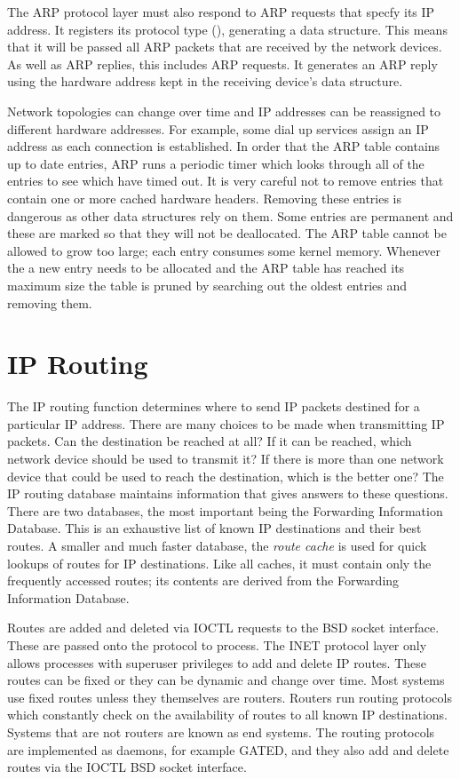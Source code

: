 The ARP protocol layer must also respond to ARP requests that specfy its IP address.
It registers its protocol type (), generating a  data structure.
This means that it will be passed all ARP packets that are received by the network devices.
As well as ARP replies, this includes ARP requests.
It generates an ARP reply using the hardware address kept in the receiving device's 
data structure.

Network topologies can change over time and IP addresses can be reassigned to different hardware
addresses.
For example, some dial up services assign an IP address as each connection is established.
In order that the ARP table contains up to date entries, 
ARP runs a periodic timer which looks through all of the  entries to see which have
timed out.
It is very careful not to remove entries that contain one or more cached hardware headers.
Removing these entries is dangerous as other data structures rely on them.
Some  entries are permanent and these are marked so that they will not be deallocated.
The ARP table cannot be allowed to grow too large; each  entry consumes some kernel memory.
Whenever the a new entry needs to be allocated and the ARP table has reached its maximum size
the table is pruned by searching out the oldest entries and removing them.

\section{IP Routing}
The IP routing function determines where to send IP packets destined for a particular IP 
address.
There are many choices to be made when transmitting IP packets.
Can the destination be reached at all?
If it can be reached, which network device should be used to transmit it?
If there is more than one network device that could be used to reach the destination, which is
the better one?
The IP routing database maintains information that gives answers to these questions.
There are two databases, the most important being the Forwarding Information Database.
This is an exhaustive list of known IP destinations and their best routes.
A smaller and much faster database, the {\em route cache} is used for quick lookups of routes
for IP destinations.
Like all caches, it must contain only the frequently accessed routes; its contents are derived
from the Forwarding Information Database.

Routes are added and deleted via IOCTL requests to the BSD socket interface.
These are passed onto the protocol to process.
The INET protocol layer only allows processes with superuser privileges to add and delete IP
routes.
These routes can be fixed or they can be dynamic and change over time.
Most systems use fixed routes unless they themselves are routers.
Routers run routing protocols which constantly check on the availability of routes to all known
IP destinations.
Systems that are not routers are known as end systems.
The routing protocols are implemented as daemons, for example GATED, and they 
also add and delete routes via the IOCTL BSD socket interface.

